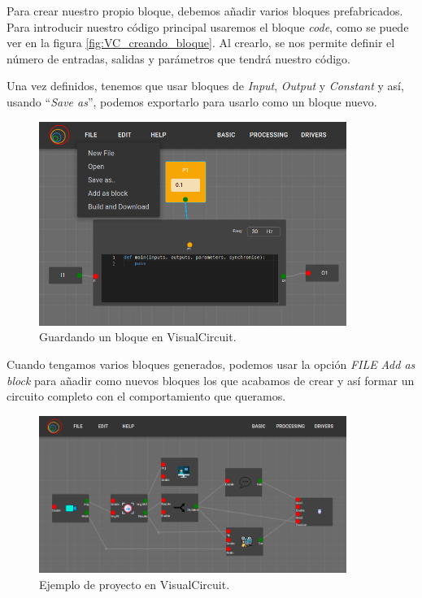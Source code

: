 Para crear nuestro propio bloque, debemos añadir varios bloques prefabricados. Para introducir nuestro código principal usaremos el bloque \textit{code}, como se puede ver en la figura \ref{fig:VC_creando_bloque}. Al crearlo, se nos permite definir el número de entradas, salidas y parámetros que tendrá nuestro código.

Una vez definidos, tenemos que usar bloques de \textit{Input}, \textit{Output} y \textit{Constant} y así, usando ``\textit{Save as}'', podemos exportarlo para usarlo como un bloque nuevo.
\begin{figure} [H]
  \begin{center}
      \includegraphics[width=10cm]{figs/c4/VC_saveas.png}
  \end{center}
  \caption[Guardando un bloque en VisualCircuit]{Guardando un bloque en VisualCircuit.}
  \label{fig:VC_saveas_bloque}
\end{figure}

Cuando tengamos varios bloques generados, podemos usar la opción \textit{FILE} \overrightarrow{ } \textit{Add as block} para añadir como nuevos bloques los que acabamos de crear y así formar un circuito completo con el comportamiento que queramos.
\begin{figure} [H]
  \begin{center}
      \includegraphics[width=10cm]{figs/c4/VC_example.png}
  \end{center}
  \caption[Ejemplo de proyecto en VisualCircuit]{Ejemplo de proyecto en VisualCircuit.}
  \label{fig:VC_example}
\end{figure}

